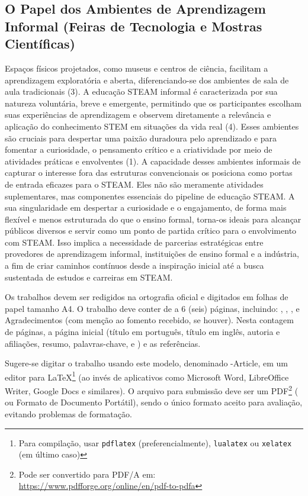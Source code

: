 \documentclass[%
  a4paper,%
  12pt,%
  fleqn,%
  english,%
  brazilian,%
]{article}
\begin{document}
\subsection{O Papel dos Ambientes de Aprendizagem Informal (Feiras de Tecnologia e Mostras Científicas)}

Espaços físicos projetados, como museus e centros de ciência, facilitam a aprendizagem exploratória e aberta, diferenciando-se dos ambientes de sala de aula tradicionais (3). A educação STEAM informal é caracterizada por sua natureza voluntária, breve e emergente, permitindo que os participantes escolham suas experiências de aprendizagem e observem diretamente a relevância e aplicação do conhecimento STEM em situações da vida real (4). Esses ambientes são cruciais para despertar uma paixão duradoura pelo aprendizado e para fomentar a curiosidade, o pensamento crítico e a criatividade por meio de atividades práticas e envolventes (1).
A capacidade desses ambientes informais de capturar o interesse fora das estruturas convencionais os posiciona como portas de entrada eficazes para o STEAM. Eles não são meramente atividades suplementares, mas componentes essenciais do pipeline de educação STEAM. A sua singularidade em despertar a curiosidade e o engajamento, de forma mais flexível e menos estruturada do que o ensino formal, torna-os ideais para alcançar públicos diversos e servir como um ponto de partida crítico para o envolvimento com STEAM. Isso implica a necessidade de parcerias estratégicas entre provedores de aprendizagem informal, instituições de ensino formal e a indústria, a fim de criar caminhos contínuos desde a inspiração inicial até a busca sustentada de estudos e carreiras em STEAM.


Os trabalhos devem ser redigidos na ortografia oficial e digitados em folhas de papel tamanho A4.
O trabalho deve conter de  a 6 (seis) páginas, incluindo: , , ,  e Agradecimentos (com menção ao fomento recebido, se houver).
Nesta contagem de páginas,  a página inicial (título em português, título em inglês, autoria e afiliações, resumo, palavras-chave,  e ) e as referências.

Sugere-se digitar o trabalho usando este modelo, denominado \UTFPR-Article, em um editor para \LaTeX{}\footnote{Para compilação, usar \texttt{pdflatex} (preferencialmente), \texttt{lualatex} ou \texttt{xelatex} (em último caso)} (ao invés de aplicativos como Microsoft\textsuperscript{\textregistered} Word\textsuperscript{\textregistered}, LibreOffice\textsuperscript{\textregistered} Writer, Google Docs e similares).
O arquivo para submissão deve ser um PDF\footnote{Pode ser convertido para PDF/A em: \url{https://www.pdfforge.org/online/en/pdf-to-pdfa}} ( ou Formato de Documento Portátil), sendo o único formato aceito para avaliação, evitando problemas de formatação.
\end{document}
